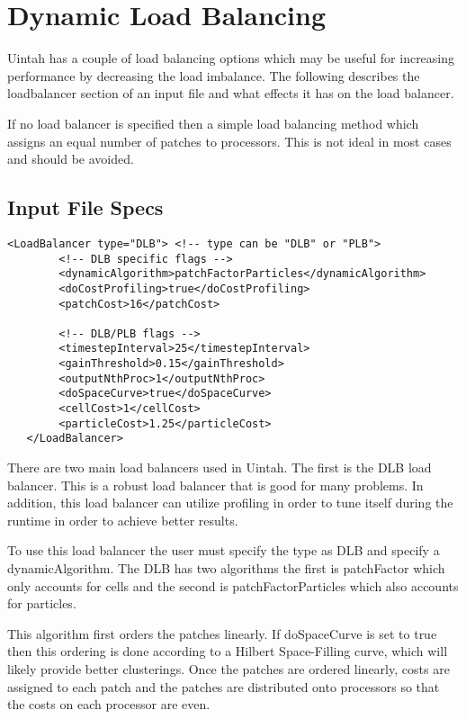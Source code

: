 \section{Dynamic Load Balancing}

Uintah has a couple of load balancing options which may be useful for increasing performance by decreasing
the load imbalance.  The following describes the loadbalancer section of an input file and what effects
it has on the load balancer.  

If no load balancer is specified then a simple load balancing method which assigns an equal number of patches
to processors. This is not ideal in most cases and should be avoided.

\subsection{Input File Specs}
\begin{Verbatim}[fontsize=\footnotesize]
   <LoadBalancer type="DLB"> <!-- type can be "DLB" or "PLB">
        <!-- DLB specific flags -->
        <dynamicAlgorithm>patchFactorParticles</dynamicAlgorithm>
        <doCostProfiling>true</doCostProfiling>
        <patchCost>16</patchCost>

        <!-- DLB/PLB flags -->
        <timestepInterval>25</timestepInterval>
        <gainThreshold>0.15</gainThreshold>
        <outputNthProc>1</outputNthProc>
        <doSpaceCurve>true</doSpaceCurve>
        <cellCost>1</cellCost>
        <particleCost>1.25</particleCost>
   </LoadBalancer>
\end{Verbatim}

There are two main load balancers used in Uintah.  The first is the DLB load balancer.
This is a robust load balancer that is good for many problems.  In addition,
this load balancer can utilize profiling in order to tune itself during the runtime
in order to achieve better results.  

To use this load balancer the user must specify the type as DLB and specify
a dynamicAlgorithm.  The DLB has two algorithms the first is patchFactor which
only accounts for cells and the second is patchFactorParticles which also accounts
for particles.    

This algorithm first orders the patches linearly.  If doSpaceCurve is set to true
then this ordering is done according to a Hilbert Space-Filling curve, which will
likely provide better clusterings.  Once the patches are ordered linearly, costs
are assigned to each patch and the patches are distributed onto processors so that
the costs on each processor are even.  

